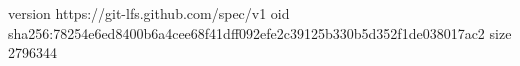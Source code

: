 version https://git-lfs.github.com/spec/v1
oid sha256:78254e6ed8400b6a4cee68f41dff092efe2c39125b330b5d352f1de038017ac2
size 2796344
